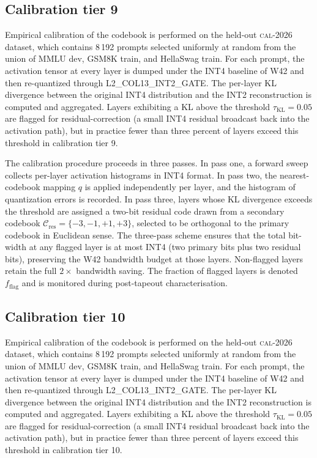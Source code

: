 \subsection{Calibration tier 9}

Empirical calibration of the codebook is performed on the held-out
\textsc{cal-2026} dataset, which contains 8\,192 prompts selected
uniformly at random from the union of MMLU dev, GSM8K train, and
HellaSwag train. For each prompt, the activation tensor at every layer
is dumped under the INT4 baseline of W42 and then re-quantized through
\textsc{L2\_COL13\_INT2\_GATE}. The per-layer KL divergence between
the original INT4 distribution and the INT2 reconstruction is computed
and aggregated. Layers exhibiting a KL above the threshold
$\tau_{\mathrm{KL}} = 0.05$ are flagged for residual-correction (a
small INT4 residual broadcast back into the activation path), but in
practice fewer than three percent of layers exceed this threshold in
calibration tier 9.

The calibration procedure proceeds in three passes. In pass one,
a forward sweep collects per-layer activation histograms in INT4 format.
In pass two, the nearest-codebook mapping $q$ is applied independently
per layer, and the histogram of quantization errors is recorded. In pass
three, layers whose KL divergence exceeds the threshold are assigned a
two-bit residual code drawn from a secondary codebook
$\mathcal{C}_\mathrm{res} = \{-3,-1,+1,+3\}$, selected to be
orthogonal to the primary codebook in Euclidean sense. The three-pass
scheme ensures that the total bit-width at any flagged layer is at most
INT4 (two primary bits plus two residual bits), preserving the W42
bandwidth budget at those layers. Non-flagged layers retain the full
$2\times$ bandwidth saving. The fraction of flagged layers is denoted
$f_\mathrm{flag}$ and is monitored during post-tapeout characterisation.


\subsection{Calibration tier 10}

Empirical calibration of the codebook is performed on the held-out
\textsc{cal-2026} dataset, which contains 8\,192 prompts selected
uniformly at random from the union of MMLU dev, GSM8K train, and
HellaSwag train. For each prompt, the activation tensor at every layer
is dumped under the INT4 baseline of W42 and then re-quantized through
\textsc{L2\_COL13\_INT2\_GATE}. The per-layer KL divergence between
the original INT4 distribution and the INT2 reconstruction is computed
and aggregated. Layers exhibiting a KL above the threshold
$\tau_{\mathrm{KL}} = 0.05$ are flagged for residual-correction (a
small INT4 residual broadcast back into the activation path), but in
practice fewer than three percent of layers exceed this threshold in
calibration tier 10.

